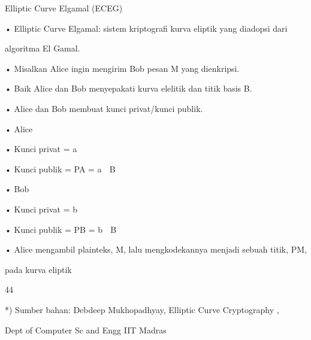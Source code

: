 \documentclass{article}
\begin{document}

Elliptic Curve Elgamal (ECEG)

• Elliptic Curve Elgamal: sistem kriptografi kurva eliptik yang diadopsi dari 

algoritma El Gamal.

• Misalkan Alice ingin mengirim Bob pesan M yang dienkripsi.

• Baik Alice dan Bob menyepakati kurva elelitik dan titik basis B.

• Alice dan Bob membuat kunci privat/kunci publik.

• Alice

• Kunci privat = a

• Kunci publik = PA = a  B

• Bob

• Kunci privat = b

• Kunci publik = PB = b  B

• Alice mengambil plainteks, M, lalu mengkodekannya menjadi sebuah titik, PM, 

pada  kurva eliptik

44

*) Sumber bahan: Debdeep Mukhopadhyay, Elliptic Curve Cryptography ,

 Dept of Computer Sc and Engg IIT Madras
\end{document}
